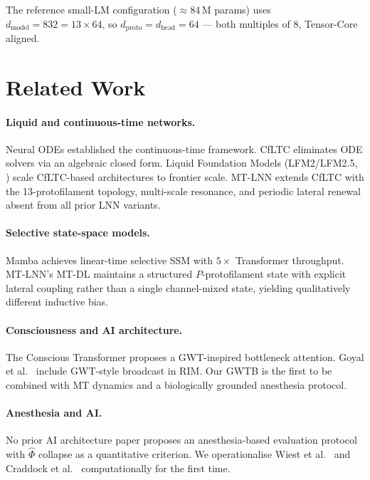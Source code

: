 \documentclass[11pt]{article}
\theoremstyle{definition}
\newcommand{\phihat}{\hat{\Phi}}
\begin{document}
The reference small-LM configuration ($\approx$84\,M params) uses $d_\text{model}=832=13\times 64$, so $d_\text{proto}=d_\text{head}=64$ — both multiples of 8, Tensor-Core aligned.

\section{Related Work}
\label{sec:related}

\paragraph{Liquid and continuous-time networks.}
Neural ODEs \citep{chen2018neural} established the continuous-time framework. CfLTC \citep{hasani2022closed} eliminates ODE solvers via an algebraic closed form. Liquid Foundation Models (LFM2/LFM2.5, \citealt{liquid2025lfm}) scale CfLTC-based architectures to frontier scale. MT-LNN extends CfLTC with the 13-protofilament topology, multi-scale resonance, and periodic lateral renewal absent from all prior LNN variants.

\paragraph{Selective state-space models.}
Mamba \citep{gu2023mamba} achieves linear-time selective SSM with $5\times$ Transformer throughput. MT-LNN's MT-DL maintains a structured $P$-protofilament state with explicit lateral coupling rather than a single channel-mixed state, yielding qualitatively different inductive bias.

\paragraph{Consciousness and AI architecture.}
The Conscious Transformer \citep{vanrullen2021deep} proposes a GWT-inspired bottleneck attention. Goyal et al.\ \citep{goyal2021recurrent} include GWT-style broadcast in RIM. Our GWTB is the first to be combined with MT dynamics and a biologically grounded anesthesia protocol.

\paragraph{Anesthesia and AI.}
No prior AI architecture paper proposes an anesthesia-based evaluation protocol with $\phihat$ collapse as a quantitative criterion. We operationalise Wiest et al.\ \citep{wiest2025quantum} and Craddock et al.\ \citep{craddock2017anesthetic} computationally for the first time.
\end{document}
